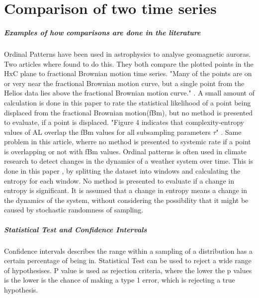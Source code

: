 \chapter{Comparison of two time series}
\paragraph{Examples of how comparisons are done in the literature}
Ordinal Patterns have been used in astrophysics to analyse geomagnetic auroras. Two articles where found to do this. They both compare the plotted points in the HxC plane to fractional Brownian motion time series. "Many of the points are on or very near the fractional Brownian motion curve, but a single point from the Helios data lies above the fractional Brownian motion curve." \cite{Weygand2019}. A small amount of calculation is done in this paper to rate the statistical likelihood of a point being displaced from the fractional Brownian motion(fBm), but no method is presented to evaluate, if a point is displaced. "Figure 4 indicates that complexity-entropy values of AL overlap the fBm values for all subsampling parameters $\tau$" \cite{Osmane2019}. Same problem in this article, wherre no method is presented to systemic rate if a point is overlapping or not with fBm values. Ordinal patterns is often used in climate research to detect changes in the dynamics of a weather system over time. This is done in this paper \cite{Saco2010}, by splitting the dataset into windows and calculating the entropy for each window. No method is presented to evaluate if a change in entropy is significant. It is assumed that a change in entropy means a change in the dynamics of the system, without considering the possibility that it might be caused by stochastic randomness of sampling. 

\paragraph{Statistical Test and Confidence Intervals}
Confidence intervals describes the range within a sampling of a distribution has a certain percentage of being in. Statistical Test can be used to reject a wide range of hypothesises. P value is used as rejection criteria, where the lower the p values is the lower is the chance of making a type 1 error, which is rejecting a true hypothesis.\cite{Smithson2003}


